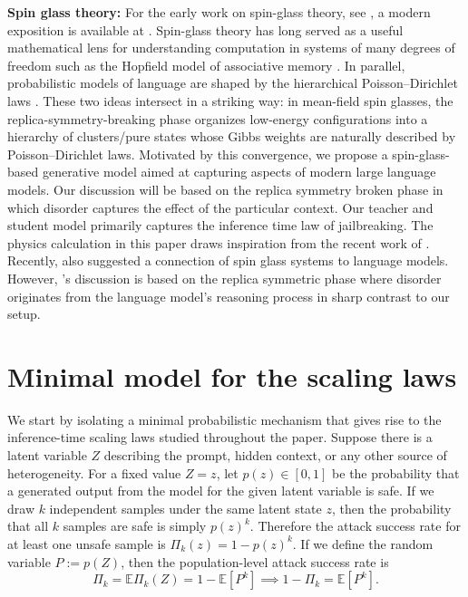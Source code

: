 \documentclass{article}
\theoremstyle{remark} %
\begin{document}
\textbf{Spin glass theory:}
For the early work on spin-glass theory, see \citep{mezard1987spin}, a modern exposition is available at \citep{mézard2009information, talagrand2010mean, talagrand2013mean, panchenko2013sherrington, krzakala2016statistical, charbonneau2023spin}. Spin-glass theory has long served as a useful mathematical lens for understanding computation in systems of many degrees of freedom such as the Hopfield model of associative memory \citep{doi:10.1073/pnas.79.8.2554}. In parallel, probabilistic models of language \citep{MacKay_Peto_1995} are shaped by the hierarchical Poisson–Dirichlet laws \citep{teh2006a, liang2007infinite}. These two ideas intersect in a striking way: in mean-field spin glasses, the replica-symmetry-breaking phase organizes low-energy configurations into a hierarchy of clusters/pure states whose Gibbs weights are naturally described by Poisson–Dirichlet laws. Motivated by this convergence, we propose a spin-glass-based generative model aimed at capturing aspects of modern large language models. Our discussion will be based on the replica symmetry broken phase in which disorder captures the effect of the particular context. Our teacher and student model primarily captures the inference time law of jailbreaking. The physics calculation in this paper draws inspiration from the recent work of \cite{aguilar2024small}. Recently, \cite{hou2025focused} also suggested a connection of spin glass systems to language models. However, \cite{hou2025focused}'s discussion is based on the replica symmetric phase where disorder originates from the language model's reasoning process in sharp contrast to our setup.




\section{Minimal model for the scaling laws}

We start by isolating a minimal probabilistic mechanism that gives rise to the inference-time scaling laws studied throughout the paper. 
Suppose there is a latent variable $Z$ describing the prompt, hidden context, or any other source of heterogeneity. For a fixed value $Z=z$, let
$
p(z)\in[0,1]
$
be the probability that a generated output from the model for the given latent variable  is safe.
If we draw $k$ independent samples under the same latent state $z$, then the probability that all $k$ samples are safe is simply $p(z)^k$.
Therefore the attack success rate for at least one unsafe sample is
$\Pi_k(z)=1-p(z)^k$.
If we define
the random variable
$P := p(Z)$,
then the population-level attack success rate is
\begin{equation}
    \Pi_k=\mathbb{E} \Pi_k(Z) = 1-\mathbb{E}[P^k] \implies 1-\Pi_k=\mathbb{E}[P^k].
\end{equation}
\end{document}
